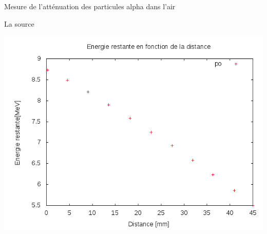 \documentclass[a4paper,11pt]{scrartcl}
\begin{document}
\begin{section}{Mesure de l'atténuation des particules alpha dans l'air}
\begin{subsection}{La source }
\begin{minipage}{0.45\textwidth}
    \end{minipage}
    \hfill
    \begin{minipage}{0.45\textwidth}
     \includegraphics[width=\textwidth]{Sabine/po_distance.png}
    \end{minipage}
  \end{subsection}
   

\end{section}
\end{document}
